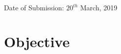 \documentclass[12pt]{article}
\begin{document}
\begin{titlepage}


{\large Date of Submission: $20^{th}$ March, 2019}\\[2cm] %


 

\vfill %

% 
% 
 
 
 \tableofcontents
 
 \newpage

\end{titlepage}

 

 
 \newpage
 
 \section{Objective}
 
\end{document}
